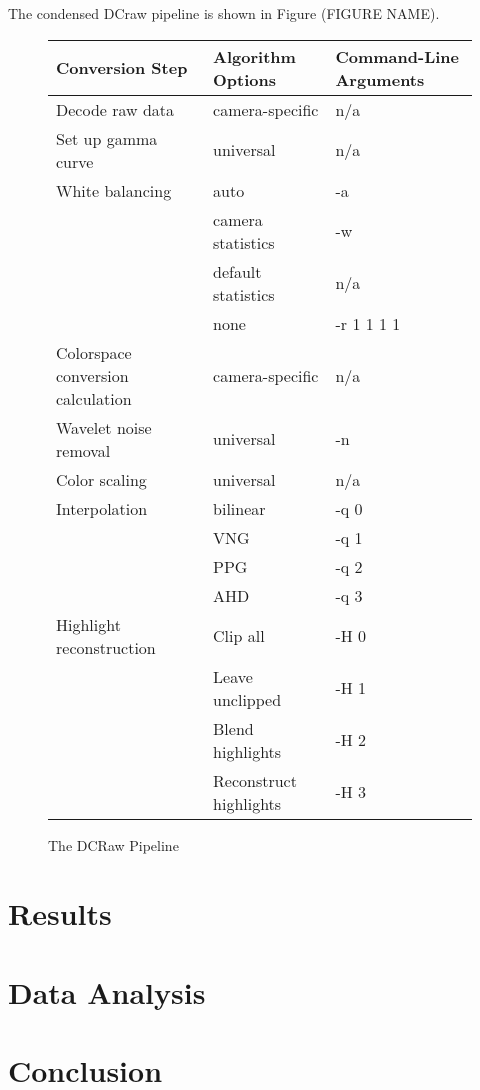 \documentclass{report}
\begin{document}
		The condensed DCraw pipeline is shown in Figure (FIGURE NAME).
		
		\begin{figure}
			\begin{center}
				\label{condenseddcraw}
				\caption{The DCRaw Pipeline}
				\begin{tabular}{lll}
					Conversion Step & Algorithm Options & Command-Line Arguments\\
					\hline
					Decode raw data & camera-specific & n/a\\
					Set up gamma curve & universal & n/a\\
					White balancing & auto & -a\\
					& camera statistics & -w\\
					& default statistics & n/a \\
					& none & -r 1 1 1 1 \\
					Colorspace conversion calculation & camera-specific & n/a\\
					Wavelet noise removal & universal & -n \\
					Color scaling & universal & n/a \\
					Interpolation & bilinear & -q 0 \\
					& VNG & -q 1 \\
					& PPG & -q 2 \\
					& AHD & -q 3 \\
					Highlight reconstruction & Clip all & -H 0 \\
					& Leave unclipped & -H 1 \\
					& Blend highlights & -H 2 \\
					& Reconstruct highlights & -H 3 \\
				\end{tabular}
					
			\end{center}
		\end{figure}
		
	\section{Results}
	\section{Data Analysis}
	\section{Conclusion}
\end{document}
